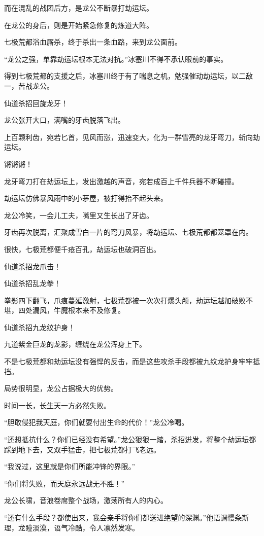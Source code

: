 \begin{this_body}
而在混乱的战团后方，是龙公不断暴打劫运坛。

在龙公的身后，则是开始紧急修复的炼道大阵。

七极荒都浴血厮杀，终于杀出一条血路，来到龙公面前。

“龙公之强，单靠劫运坛根本无法对抗。”冰塞川不得不承认眼前的事实。

得到七极荒都的支援之后，冰塞川终于有了喘息之机，勉强催动劫运坛，以二敌一，苦战龙公。

仙道杀招回旋龙牙！

龙公张开大口，满嘴的牙齿脱落飞出。

上百颗利齿，宛若匕首，见风而涨，迅速变大，化为一群雪亮的龙牙弯刀，斩向劫运坛。

锵锵锵！

龙牙弯刀打在劫运坛上，发出激越的声音，宛若成百上千件兵器不断碰撞。

劫运坛仿佛暴风雨中的小茅屋，被打得抬不起头来。

龙公冷笑，一会儿工夫，嘴里又生长出了牙齿。

牙齿再次脱离，汇聚成雪白一片的弯刀风暴，将劫运坛、七极荒都都笼罩在内。

很快，七极荒都便千疮百孔，劫运坛也破洞百出。

仙道杀招龙爪击！

仙道杀招乱龙拳！

拳影四下翻飞，爪痕蔓延激射，七极荒都被一次次打爆头颅，劫运坛越加破败不堪，四处漏风，牛魔根本来不及修复。

仙道杀招九龙纹护身！

九道紫金巨龙的龙影，缠绕在龙公浑身上下。

不是七极荒都和劫运坛没有强悍的反击，而是这些攻杀手段都被九纹龙护身牢牢抵挡。

局势很明显，龙公占据极大的优势。

时间一长，长生天一方必然失败。

“胆敢侵犯我天庭，你们就要付出生命的代价！”龙公冷喝。

“还想抵抗什么？你们已经没有希望。”龙公狠狠一踏，杀招迸发，将整个劫运坛都踩到地下去，又双手猛击，把七极荒都打飞老远。

“我说过，这里就是你们所能冲锋的界限。”

“你们将失败，而天庭永远战无不胜！”

龙公长啸，音浪卷席整个战场，激荡所有人的内心。

“还有什么手段？都使出来，我会亲手将你们都送进绝望的深渊。”他语调慢条斯理，龙瞳淡漠，语气冷酷，令人凛然发寒。


\end{this_body}
